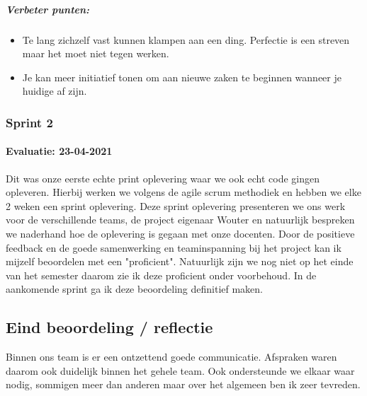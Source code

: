 	\subparagraph{Verbeter punten:}
	\begin{itemize}
		\setlength{\itemsep}{0pt}%
		\setlength{\parskip}{0pt}%
		\item Te lang zichzelf vast kunnen klampen aan een ding.
		Perfectie is een streven maar het moet niet tegen werken.
		\item Je kan meer initiatief tonen om aan nieuwe zaken te beginnen wanneer je huidige af zijn.
	\end{itemize}

	\bigskip

	\subsubsection{Sprint 2}
	\paragraph{Evaluatie: 23-04-2021}
	Dit was onze eerste echte print oplevering waar we ook echt code gingen opleveren.
	Hierbij werken we volgens de agile scrum methodiek en hebben we elke 2 weken een sprint oplevering.
	Deze sprint oplevering presenteren we ons werk voor de verschillende teams, de project eigenaar Wouter en
	natuurlijk bespreken we naderhand hoe de oplevering is gegaan met onze docenten.
	Door de positieve feedback en de goede samenwerking en teaminspanning bij het project kan ik mijzelf
	beoordelen met een "proficient".
	Natuurlijk zijn we nog niet op het einde van het semester daarom zie ik deze proficient onder voorbehoud.
	In de aankomende sprint ga ik deze beoordeling definitief maken.





\subsection{Eind beoordeling / reflectie}
%
	Binnen ons team is er een ontzettend goede communicatie. Afspraken waren daarom ook duidelijk binnen het gehele team.
	Ook ondersteunde we elkaar waar nodig, sommigen meer dan anderen maar over het algemeen ben ik zeer tevreden.

\newpage

